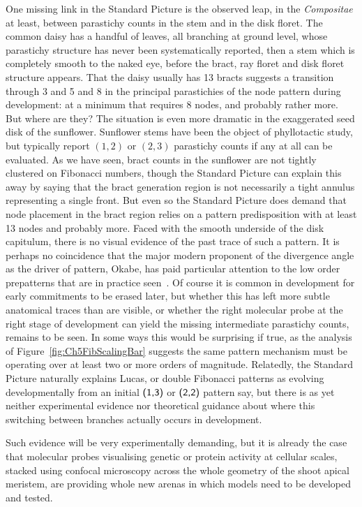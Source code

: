 One missing link in the Standard Picture is the observed leap, in the \textit{Compositae} at least, between parastichy counts in the stem and in the disk floret. The common daisy has a handful of leaves, all branching at ground level, whose parastichy structure has never been systematically reported, then a stem which is completely smooth to the naked eye, before the bract, ray floret and disk floret structure appears. That the daisy usually has 13 bracts suggests a transition through 3 and 5 and 8 in the principal parastichies of the node pattern during development: at a minimum that requires 8 nodes, and probably rather more. But where are they? The situation is even more dramatic in the exaggerated seed disk of the sunflower. Sunflower stems have been the object of phyllotactic study, but typically report $(1,2)$ or $(2,3)$ parastichy counts if any at all can be evaluated. As we have seen, bract counts in the sunflower are not tightly clustered on Fibonacci numbers, though the Standard Picture can explain this away by saying that the bract generation region is not necessarily a tight annulus representing a single front. But even so the Standard Picture does demand that node placement in the bract region relies on a pattern predisposition with at least 13 nodes and probably more. Faced with the smooth underside of the disk capitulum, there is no visual evidence of the past trace of such a pattern. It is perhaps no coincidence that the major modern  proponent of the divergence angle as the driver of pattern, Okabe, has paid particular attention to the low order prepatterns that are in practice seen~\autocite{okabeBiophysicalOptimalityGolden2015}. Of course it is common in development for early commitments to be erased later, but whether this has left more subtle anatomical traces than are visible, or whether the right molecular probe at the right stage of development can yield the missing intermediate parastichy counts, remains to be seen. 
 In some ways this would be surprising if true, as the analysis of Figure~\ref{fig:Ch5FibScalingBar} suggests the same pattern mechanism must be operating over at least two or more orders of magnitude. Relatedly, the Standard Picture naturally explains Lucas, or double Fibonacci patterns as evolving developmentally from an initial $\textsf{(1,3)}$ or $\textsf{(2,2)}$ pattern say, but there is as yet neither experimental evidence nor theoretical guidance about where this switching between branches actually occurs in development. 
 
Such evidence will be very experimentally demanding, but it is already the case that molecular probes visualising genetic or protein activity at cellular scales, stacked using confocal microscopy across the whole geometry of the shoot apical meristem, are providing whole new arenas in which models need to be developed and tested. 
 
